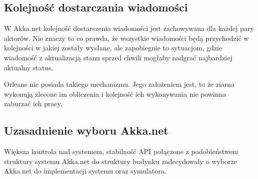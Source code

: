 \subsection*{Kolejność dostarczania wiadomości}
W Akka.net kolejność dostarczenia wiadomości jest zachowywana dla każdej pary aktorów. Nie znaczy to co prawda, że wszystkie wiadomości będą przychodzić w kolejności w jakiej zostały wysłane, ale zapobiegnie to sytuacjom, gdzie wiadomość z aktualizacją stanu sprzed chwili mogłaby nadgrać najbardziej aktualny status.

Orleans nie posiada takiego mechanizmu. Jego założeniem jest, to że ziarna wykonują zlecone im obliczenia i kolejność ich wykonywania nie powinna zaburzać ich pracy.

\subsection*{Uzasadnienie wyboru Akka.net}
Większa kontrola nad systemem, stabilność API połączone z podobieństwem struktury systemu Akka.net do struktury budynku zadecydowały o wyborze Akka.net do implementacji systemu oraz symulatora.

